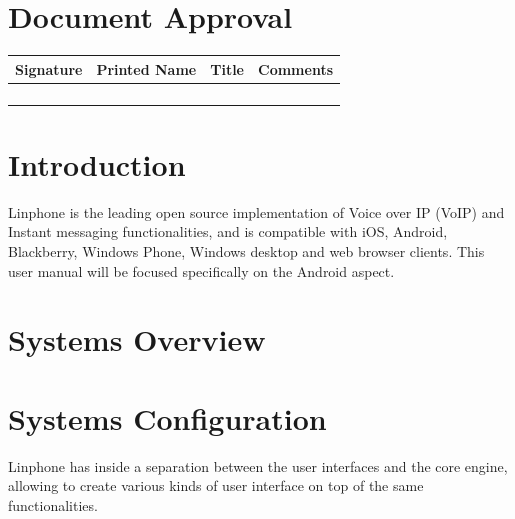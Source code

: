 \documentclass[11pt]{article}
\begin{document}
\section{Document Approval}
\begin{table}[h]
\begin{tabular}{llll}
\textbf{Signature}     & \textbf{Printed Name} & \textbf{Title}        & \textbf{Comments}     \\ \hline
\multicolumn{1}{|l|}{} & \multicolumn{1}{L{3.5cm}|}{} & \multicolumn{1}{L{3.5cm}|}{} & \multicolumn{1}{L{4cm}|}{} \\ \hline
\multicolumn{1}{|l|}{} & \multicolumn{1}{l|}{} & \multicolumn{1}{l|}{} & \multicolumn{1}{l|}{} \\ \hline
\multicolumn{1}{|l|}{} & \multicolumn{1}{l|}{} & \multicolumn{1}{l|}{} & \multicolumn{1}{l|}{} \\ \hline
\multicolumn{1}{|l|}{} & \multicolumn{1}{l|}{} & \multicolumn{1}{l|}{} & \multicolumn{1}{l|}{} \\ \hline
\end{tabular}
\end{table}

\newpage
\section{Introduction}
Linphone is the leading open source implementation of Voice over IP (VoIP) and Instant messaging functionalities, and is compatible with iOS, Android, Blackberry, Windows Phone, Windows desktop and web browser clients. This user manual will be focused specifically on the Android aspect. 
\section{Systems Overview}

\section{Systems Configuration}
Linphone has inside a separation between the user interfaces and the core engine, allowing to create various kinds of user interface on top of the same functionalities.\\
\end{document}
